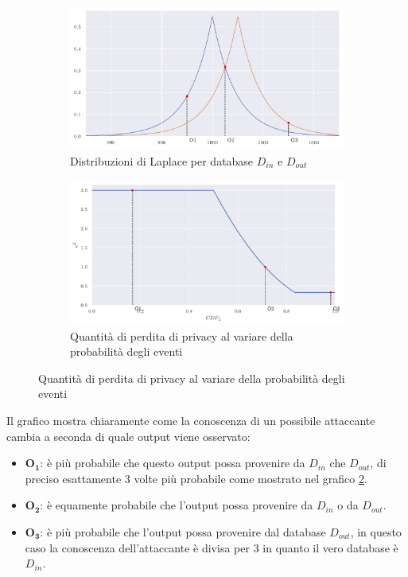 \begin{figure}[H]
    \begin{subfigure}[t]{.5\textwidth}
        \centering
        \includegraphics[width=\linewidth]{plots/laplace_plrv_two_dists.pdf}
        \caption{Distribuzioni di Laplace per database $D_{in}$ e $D_{out}$}
        \label{plot:plrv_two_dists}
    \end{subfigure}
    \begin{subfigure}[t]{.5\textwidth}
        \centering
        \includegraphics[width=\linewidth]{plots/laplace_e^plrv.pdf}
        \caption{Quantità di perdita di privacy al variare della probabilità degli eventi}
        \label{plot:e^prlv}
    \end{subfigure}
    \label{plot:plrv}
\end{figure}

Il grafico mostra chiaramente come la conoscenza di un possibile attaccante cambia a seconda di quale output viene osservato:
\begin{itemize}
    \item $\boldsymbol{O_1}$: è più probabile che questo output possa provenire da $D_{in}$ che $D_{out}$, di preciso esattamente 3 volte più probabile come mostrato nel grafico \ref{plot:e^prlv}.
    \item $\boldsymbol{O_2}$: è equamente probabile che l'output possa provenire da $D_{in}$ o da $D_{out}$.
    \item $\boldsymbol{O_3}$: è più probabile che l'output possa provenire dal database $D_{out}$, in questo caso la conoscenza dell'attaccante è divisa per 3 in quanto il vero database è $D_{in}$. 
\end{itemize}

